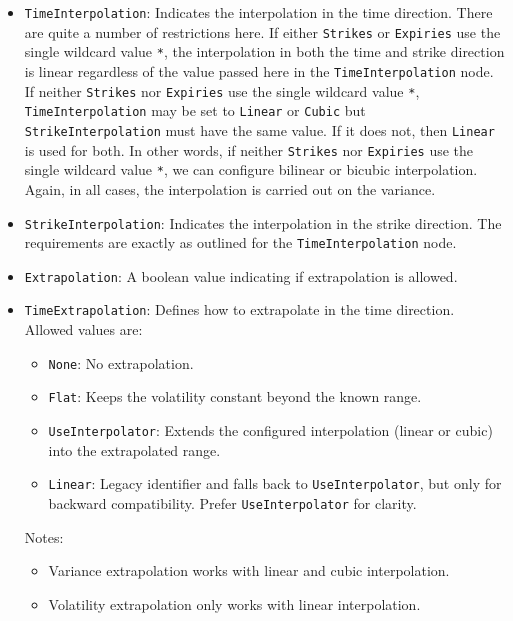 \begin{itemize}
\item \lstinline!TimeInterpolation!:
Indicates the interpolation in the time direction. There are quite a number of restrictions here. If either \lstinline!Strikes! or \lstinline!Expiries! use the single wildcard value \lstinline!*!, the interpolation in both the time and strike direction is linear regardless of the value passed here in the \lstinline!TimeInterpolation! node. If neither \lstinline!Strikes! nor \lstinline!Expiries! use the single wildcard value \lstinline!*!, \lstinline!TimeInterpolation! may be set to \lstinline!Linear! or \lstinline!Cubic! but \lstinline!StrikeInterpolation! must have the same value. If it does not, then \lstinline!Linear! is used for both. In other words, if neither \lstinline!Strikes! nor \lstinline!Expiries! use the single wildcard value \lstinline!*!, we can configure bilinear or bicubic interpolation. Again, in all cases, the interpolation is carried out on the variance.

\item \lstinline!StrikeInterpolation!:
Indicates the interpolation in the strike direction. The requirements are exactly as outlined for the \lstinline!TimeInterpolation! node.

\item \lstinline!Extrapolation!:
A boolean value indicating if extrapolation is allowed.

\item \lstinline!TimeExtrapolation!:
Defines how to extrapolate in the time direction. Allowed values are:
  \begin{itemize}
    \item \lstinline!None!: No extrapolation.
    \item \lstinline!Flat!: Keeps the volatility constant beyond the known range.
    \item \lstinline!UseInterpolator!: Extends the configured interpolation (linear or cubic) into the extrapolated range.
    \item \lstinline!Linear!: Legacy identifier and falls back to \lstinline!UseInterpolator!, but only for backward compatibility. Prefer \lstinline!UseInterpolator! for clarity.
  \end{itemize}
  Notes:
  \begin{itemize}
    \item Variance extrapolation works with linear and cubic interpolation.
    \item Volatility extrapolation only works with linear interpolation.
  \end{itemize}


\end{itemize}
